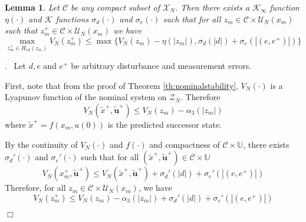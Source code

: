 \documentclass{article}
\newtheorem{lemma}{Lemma}
\newenvironment{proof}{\noindent {\em Proof}.\ }{\hspace*{\fill}$\Box$\medskip\\}
\newcommand{\abs}[1]{\left\lvert #1 \right\rvert}
\begin{document}
\begin{lemma}
\label{lem:annoying}
Let $\mathcal{C}$ be any compact subset of $\mathcal{X}_N$. Then
there exists a $\mathcal{K}_\infty$ 
function $\eta(\cdot)$ and $\mathcal{K}$ functions $\sigma_d(\cdot)$ and $\sigma_e(\cdot)$ such that for all
$z_m \in \mathcal{C} \times \mathcal{U}_N(x_m)$ such that $z_m^+ \in \mathcal{C} \times \mathcal{U}_N(x_m)$ we have
\begin{equation*}
\max_{z_m^+ \in H_{ed}(z_m)} V_N(z_m^+) \leq \max\{V_N(z_m)-\eta(\abs{z_m}),\sigma_d(\abs{d})+
\sigma_e(\abs{(e,e^+)})\}
\end{equation*}
\end{lemma}
\begin{proof}
Let $d,e$ and $e^+$ be arbitrary disturbance and measurement errors.

First, note that from the proof of Theorem \ref{th:nominalstability},
$V_N(\cdot)$ is a Lyapunov function of the nominal system on $\mathcal{Z}_N$.
Therefore
\begin{equation*}
V_N(\tilde{x}^+,\tilde{\mathbf{u}}^+) \leq V_N(z_m) - \alpha_3(\abs{z_m})
\end{equation*}
where $\tilde{x}^+ = f(x_m,u(0))$ is the predicted successor state.

By the continuity of $V_N(\cdot)$ and $f(\cdot)$ and compactness of $\mathcal{C} \times \mathbb{U}$,
there exists $\sigma_d'(\cdot)$ and $\sigma_e'(\cdot)$ such that for all $(\tilde{x}^+,\tilde{\mathbf{u}}^+) \in 
\mathcal{C} \times \mathbb{U}$
\begin{equation}
\label{eq:ed1}
V_N(x_m^+,\tilde{\mathbf{u}}^+) \leq V_N(\tilde{x}^+,\tilde{\mathbf{u}}^+) + \sigma_d'(\abs{d}) + \sigma_e'(\abs{
(e,e^+)})
\end{equation}
Therefore, for all $z_m \in \mathcal{C} \times \mathcal{U}_N(x_m)$, we have
\begin{equation}
\label{eq:ed2}
V_N(z_m^+) \leq V_N(z_m) - \alpha_3(\abs{z_m}) + \sigma_d'(\abs{d}) + \sigma_e'(\abs{(e,e^+)})
\end{equation}



\end{proof}
\end{document}
